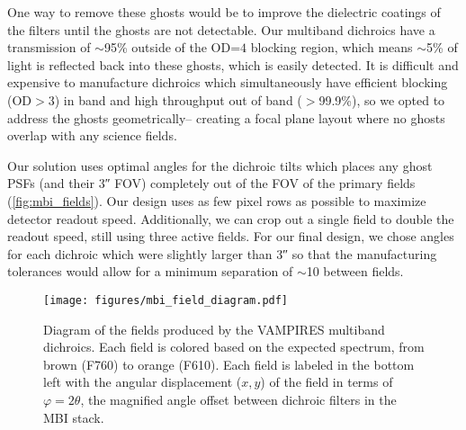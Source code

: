 One way to remove these ghosts would be to improve the dielectric coatings of the filters until the ghosts are not detectable. Our multiband dichroics have a transmission of $\sim$95\% outside of the OD=$4$ blocking region, which means $\sim$5\% of light is reflected back into these ghosts, which is easily detected. It is difficult and expensive to manufacture dichroics which simultaneously have efficient blocking (OD$>$3) in band and high throughput out of band ($>$99.9\%), so we opted to address the ghosts geometrically-- creating a focal plane layout where no ghosts overlap with any science fields.

Our solution uses optimal angles for the dichroic tilts which places any ghost PSFs (and their \ang{;;3} FOV) completely out of the FOV of the primary fields (\autoref{fig:mbi_fields}). Our design uses as few pixel rows as possible to maximize detector readout speed. Additionally, we can crop out a single field to double the readout speed, still using three active fields. For our final design, we chose angles for each dichroic which were slightly larger than \ang{;;3} so that the manufacturing tolerances would allow for a minimum separation of $\sim$\SI{10}{\pixel} between fields.

\begin{figure}
    \centering
    \texttt{[image: figures/mbi\_field\_diagram.pdf]}
    \caption{Diagram of the fields produced by the VAMPIRES multiband dichroics. Each field is colored based on the expected spectrum, from brown (F760) to orange (F610). Each field is labeled in the bottom left with the angular displacement ($x,y$) of the field in terms of $\varphi=2\theta$, the magnified angle offset between dichroic filters in the MBI stack.\label{fig:mbi_fields}}
\end{figure}
